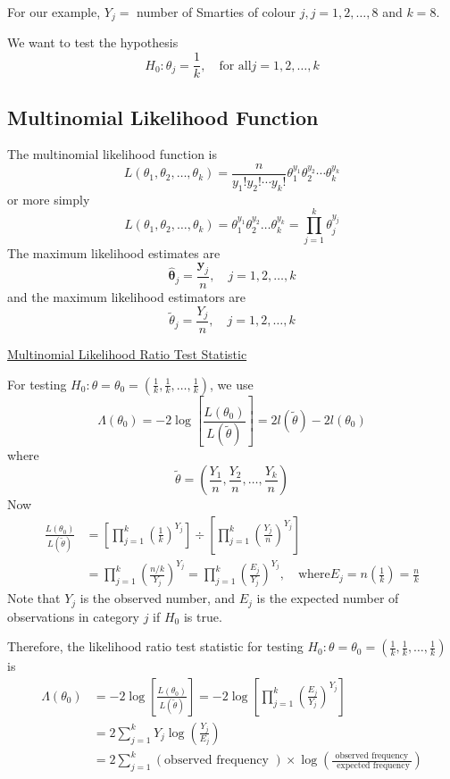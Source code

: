 For our example, $Y_{j}=$ number of Smarties of colour $j, j=1,2, \ldots, 8$ and $k=8$.

We want to test the hypothesis
\[ H_{0}: \theta_{j}=\frac{1}{k}, \quad \text{for all} j=1,2, \ldots, k \]

\subsection{Multinomial Likelihood Function}
The multinomial likelihood function is
\[
    L\left(\theta_{1}, \theta_{2}, \ldots, \theta_{k}\right)=\frac{n}{y_{1} ! y_{2} ! \cdots y_{k} !} \theta_{1}^{y_{1}} \theta_{2}^{y_{2}} \cdots \theta_{k}^{y_{k}}
\]
or more simply
\[
    L\left(\theta_{1}, \theta_{2}, \ldots, \theta_{k}\right)=\theta_{1}^{y_{1}} \theta_{2}^{y_{2}} \ldots \theta_{k}^{y_{k}}=\prod_{j=1}^{k} \theta_{j}^{y_{j}}
\]
The maximum likelihood estimates are
\[
    \hat{\bm{\theta}}_{j}=\frac{\bm{y}_{j}}{n}, \quad j=1,2, \ldots, k
\]
and the maximum likelihood estimators are
\[
    \tilde{\theta}_{j}=\frac{Y_{j}}{n}, \quad j=1,2, \ldots, k
\]

\underline{Multinomial Likelihood Ratio Test Statistic}

For testing $H_{0}: \theta=\theta_{0}=\left(\frac{1}{k}, \frac{1}{k}, \ldots, \frac{1}{k}\right)$, we use
\[
    \Lambda\left(\theta_{0}\right)=-2 \log \left[\frac{L\left(\theta_{0}\right)}{L(\tilde{\theta})}\right]=2 l(\tilde{\theta})-2 l\left(\theta_{0}\right)
\]
where
\[
    \tilde{\theta}=\left(\frac{Y_{1}}{n}, \frac{Y_{2}}{n}, \ldots, \frac{Y_{k}}{n}\right)
\]
Now
\[
    \begin{aligned}
        \frac{L\left(\theta_{0}\right)}{L(\tilde{\theta})} & =\left[\prod_{j=1}^{k}\left(\frac{1}{k}\right)^{Y_{j}}\right] \div\left[\prod_{j=1}^{k}\left(\frac{Y_{j}}{n}\right)^{Y_{j}}\right]                                               \\
                                                           & =\prod_{j=1}^{k}\left(\frac{n / k}{Y_{j}}\right)^{Y_{j}}=\prod_{j=1}^{k}\left(\frac{E_{j}}{Y_{j}}\right)^{Y_{j}}, \quad \text{where} E_{j}=n\left(\frac{1}{k}\right)=\frac{n}{k}
    \end{aligned}
\]
Note that $Y_{j}$ is the observed number, and $E_{j}$ is the expected number of observations in category $j$ if $H_{0}$ is true.

Therefore, the likelihood ratio test statistic for testing $H_{0}: \theta=\theta_{0}=\left(\frac{1}{k}, \frac{1}{k}, \ldots, \frac{1}{k}\right)$ is
\[
    \begin{aligned}
        \Lambda\left(\theta_{0}\right) & =-2 \log \left[\frac{L\left(\theta_{0}\right)}{L(\tilde{\theta})}\right]=-2 \log \left[\prod_{j=1}^{k}\left(\frac{E_{j}}{Y_{j}}\right)^{Y_{j}}\right] \\
                                       & =2 \sum_{j=1}^{k} Y_{j} \log \left(\frac{Y_{j}}{E_{j}}\right)                                                                                         \\
                                       & =2 \sum_{j=1}^{k}(\text{observed frequency }) \times \log \left(\frac{\text{ observed frequency }}{\text{ expected frequency}}\right)
    \end{aligned}
\]


